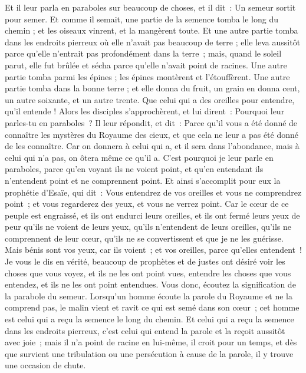 \begin{multicols}{2}
Et il leur parla en paraboles sur beaucoup de choses, et il dit~: Un semeur sortit pour semer.
Et comme il semait, une partie de la semence tomba le long du chemin ; et les oiseaux vinrent, et la mangèrent toute.
Et une autre partie tomba dans les endroits pierreux où elle n'avait pas beaucoup de terre ; elle leva aussitôt parce qu'elle n'entrait pas profondément dans la terre~;
mais, quand le soleil parut, elle fut brûlée et sécha parce qu'elle n'avait point de racines.
Une autre partie tomba parmi les épines ; les épines montèrent et l'étouffèrent.
Une autre partie tomba dans la bonne terre ; et elle donna du fruit, un grain en donna cent, un autre soixante, et un autre trente.
Que celui qui a des oreilles pour entendre, qu'il entende !
Alors les disciples s'approchèrent, et lui dirent~: Pourquoi leur parles-tu en paraboles~?
Il leur répondit, et dit~: Parce qu'il vous a été donné de connaître les mystères du Royaume des cieux, et que cela ne leur a pas été donné de les connaître.
Car on donnera à celui qui a, et il sera dans l'abondance, mais à celui qui n'a pas, on ôtera même ce qu'il a.
C'est pourquoi je leur parle en paraboles, parce qu'en voyant ils ne voient point, et qu'en entendant ils n'entendent point et ne comprennent point.
Et ainsi s'accomplit pour eux la prophétie d'Esaïe, qui dit~: Vous entendrez de vos oreilles et vous ne comprendrez point~; et vous regarderez des yeux, et vous ne verrez point.
Car le cœur de ce peuple est engraissé, et ils ont endurci leurs oreilles, et ils ont fermé leurs yeux de peur qu'ils ne voient de leurs yeux, qu'ils n'entendent de leurs oreilles, qu'ils ne comprennent de leur cœur, qu'ils ne se convertissent et que je ne les guérisse.
Mais bénis sont vos yeux, car ils voient~; et vos oreilles, parce qu'elles entendent~!
Je vous le dis en vérité, beaucoup de prophètes et de justes ont désiré voir les choses que vous voyez, et ils ne les ont point vues, entendre les choses que vous entendez, et ils ne les ont point entendues.
Vous donc, écoutez la signification de la parabole du semeur.
Lorsqu'un homme écoute la parole du Royaume et ne la comprend pas, le malin vient et ravit ce qui est semé dans son cœur~; cet homme est celui qui a reçu la semence le long du chemin.
Et celui qui a reçu la semence dans les endroits pierreux, c'est celui qui entend la parole et la reçoit aussitôt avec joie~;
mais il n'a point de racine en lui-même, il croit pour un temps, et dès que survient une tribulation ou une persécution à cause de la parole, il y trouve une occasion de chute.

\end{multicols}
